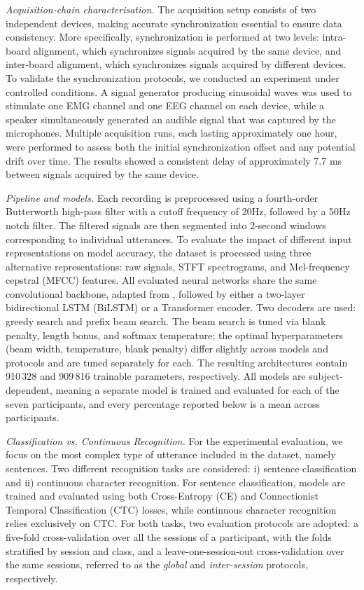 \documentclass{article}
\begin{document}
\textit{Acquisition-chain characterisation.} The acquisition setup consists of two independent devices, making accurate synchronization essential to ensure data consistency. More specifically, synchronization is performed at two levels: intra-board alignment, which synchronizes signals acquired by the same device, and inter-board alignment, which synchronizes signals acquired by different devices. To validate the synchronization protocols, we conducted an experiment under controlled conditions. A signal generator producing sinusoidal waves was used to stimulate one EMG channel and one EEG channel on each device, while a speaker simultaneously generated an audible signal that was captured by the microphones. Multiple acquisition runs, each lasting approximately one hour, were performed to assess both the initial synchronization offset and any potential drift over time. The results showed a consistent delay of approximately 7.7 ms between signals acquired by the same device.



\textit{Pipeline and models.} Each recording is preprocessed using a fourth-order Butterworth high-pass filter with a cutoff frequency of 20Hz, followed by a 50Hz notch filter. The filtered signals are then segmented into 2-second windows corresponding to individual utterances. To evaluate the impact of different input representations on model accuracy, the dataset is processed using three alternative representations: raw signals, STFT spectrograms, and Mel-frequency cepstral (MFCC) features. All evaluated neural networks share the same convolutional backbone, adapted from \cite{Spacone2026_SilentWear}, followed by either a two-layer bidirectional LSTM (BiLSTM) or a Transformer encoder. Two decoders are used: greedy search and prefix beam search. The beam search is tuned via blank penalty, length bonus, and softmax temperature; the optimal hyperparameters (beam width, temperature, blank penalty) differ slightly across models and protocols and are tuned separately for each. The resulting architectures contain 910\,328 and 909\,816 trainable parameters, respectively. All models are subject-dependent, meaning a separate model is trained and evaluated for each of the seven participants, and every percentage reported below is a mean across participants.


\textit{Classification vs. Continuous Recognition.} For the experimental evaluation, we focus on the most complex type of utterance included in the dataset, namely sentences. Two different recognition tasks are considered: i) sentence classification and ii) continuous character recognition. For sentence classification, models are trained and evaluated using both Cross-Entropy (CE) and Connectionist Temporal Classification (CTC) losses, while continuous character recognition relies exclusively on CTC.
For both tasks, two evaluation protocols are adopted: a five-fold cross-validation over all the sessions of a participant, with the folds stratified by session and class, and a leave-one-session-out cross-validation over the same sessions, referred to as the \textit{global} and \textit{inter-session} protocols, respectively.
\end{document}
